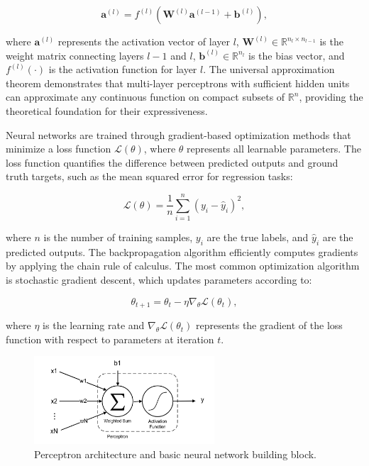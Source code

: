 \begin{equation}
\mathbf{a}^{(l)} = f^{(l)}\left(\mathbf{W}^{(l)}\mathbf{a}^{(l-1)} + \mathbf{b}^{(l)}\right),
\end{equation}

where $\mathbf{a}^{(l)}$ represents the activation vector of layer $l$, $\mathbf{W}^{(l)} \in \mathbb{R}^{n_l \times n_{l-1}}$ is the weight matrix connecting layers $l-1$ and $l$, $\mathbf{b}^{(l)} \in \mathbb{R}^{n_l}$ is the bias vector, and $f^{(l)}(\cdot)$ is the activation function for layer $l$. The universal approximation theorem demonstrates that multi-layer perceptrons with sufficient hidden units can approximate any continuous function on compact subsets of $\mathbb{R}^n$, providing the theoretical foundation for their expressiveness.

Neural networks are trained through gradient-based optimization methods that minimize a loss function $\mathcal{L}(\theta)$, where $\theta$ represents all learnable parameters. The loss function quantifies the difference between predicted outputs and ground truth targets, such as the mean squared error for regression tasks:

\begin{equation}
\mathcal{L}(\theta) = \frac{1}{n}\sum_{i=1}^{n}(y_i - \hat{y}_i)^2,
\end{equation}

where $n$ is the number of training samples, $y_i$ are the true labels, and $\hat{y}_i$ are the predicted outputs. The backpropagation algorithm efficiently computes gradients by applying the chain rule of calculus. The most common optimization algorithm is stochastic gradient descent, which updates parameters according to:

\begin{equation}
\theta_{t+1} = \theta_t - \eta \nabla_\theta \mathcal{L}(\theta_t),
\end{equation}

where $\eta$ is the learning rate and $\nabla_\theta \mathcal{L}(\theta_t)$ represents the gradient of the loss function with respect to parameters at iteration $t$.

\begin{figure}[t]
\centering
\includegraphics[width=0.6\textwidth]{Images/perceptron.png}
\caption{Perceptron architecture and basic neural network building block.}
\label{fig:perceptron}
\end{figure}

